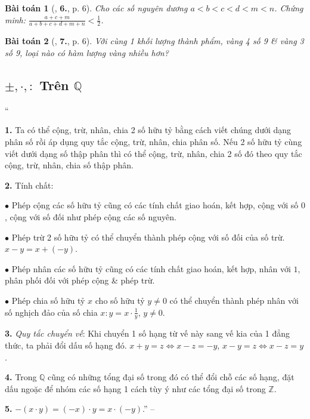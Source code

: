 \documentclass{article}
\numberwithin{equation}{section}
\newtheorem{baitoan}{Bài toán}[section]
\begin{document}
\begin{baitoan}[\cite{Tuyen_Toan_7}, \textbf{6.}, p. 6]
	Cho các số nguyên dương $a < b < c < d < m < n$. Chứng minh: $\frac{a + c + m}{ a + b + c + d + m + n} < \frac{1}{2}$.
\end{baitoan}

\begin{baitoan}[\cite{Tuyen_Toan_7}, \textbf{7.}, p. 6]
	Với cùng 1 khối lượng thành phẩm, vàng 4 số 9 \& vàng 3 số 9, loại nào có hàm lượng vàng nhiều hơn?
\end{baitoan}


\subsection{$\pm,\cdot,:$ Trên $\mathbb{Q}$}
``\begin{enumerate*}
	\item[\textbf{1.}] Ta có thể cộng, trừ, nhân, chia 2 số hữu tỷ bằng cách viết chúng dưới dạng phân số rồi áp dụng quy tắc cộng, trừ, nhân, chia phân số. Nếu 2 số hữu tỷ cùng viết dưới dạng số thập phân thì có thể cộng, trừ, nhân, chia 2 số đó theo quy tắc cộng, trừ, nhân, chia số thập phân.
	\item[\textbf{2.}] Tính chất:
	\begin{enumerate*}
		\item[$\bullet$] Phép cộng các số hữu tỷ cũng có các tính chất giao hoán, kết hợp, cộng với số $0$, cộng với số đối như phép cộng các số nguyên.
		\item[$\bullet$] Phép trừ 2 số hữu tỷ có thể chuyển thành phép cộng với số đối của số trừ. $x - y = x + (-y)$.
		\item[$\bullet$] Phép nhân các số hữu tỷ cũng có các tính chất giao hoán, kết hợp, nhân với $1$, phân phối đối với phép cộng \& phép trừ.
		\item[$\bullet$] Phép chia số hữu tỷ $x$ cho số hữu tỷ $y\ne 0$ có thể chuyển thành phép nhân với số nghịch đảo của số chia $x:y = x\cdot\frac{1}{y}$, $y\ne 0$.
	\end{enumerate*}
	\item[\textbf{3.}] \textit{Quy tắc chuyển vế}: Khi chuyển 1 số hạng từ vế này sang vế kia của 1 đẳng thức, ta phải đổi dấu số hạng đó. $x + y = z\Leftrightarrow x - z = -y$, $x - y = z\Leftrightarrow x - z = y$.
	\item[\textbf{4.}] Trong $\mathbb{Q}$ cũng có những tổng đại số trong đó có thể đổi chỗ các số hạng, đặt dấu ngoặc để nhóm các số hạng 1 cách tùy ý như các tổng đại số trong $\mathbb{Z}$.
	\item[\textbf{5.}] $-(x\cdot y) = (-x)\cdot y = x\cdot(-y)$.'' -- \cite[pp. 6--7]{Tuyen_Toan_7}
\end{enumerate*}
\end{document}
